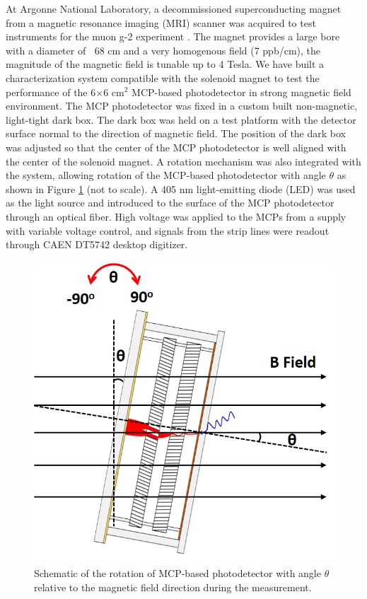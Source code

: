 \documentclass[preprint,5p]{elsarticle}
\begin{document}
At Argonne National Laboratory, a decommissioned superconducting magnet from a 
magnetic resonance imaging (MRI) scanner was acquired to test instruments for 
the muon g-2 experiment \cite{Magnet}. The magnet provides a large bore with a 
diameter of $~$ 68 cm and a very homogenous field (7 ppb/cm), the magnitude of 
the magnetic field is tunable up to 4 Tesla. We have built a characterization 
system compatible with the solenoid magnet to test the performance of the 
6$\times$6 cm$^2$ MCP-based photodetector in strong magnetic field environment.  
The MCP photodetector was fixed in a custom built non-magnetic, light-tight 
dark box. The dark box was held on a test platform with the detector surface 
normal to the direction of magnetic field. The position of the dark box was 
adjusted so that the center of the MCP photodetector is well aligned with the 
center of the solenoid magnet. A rotation mechanism was also integrated with 
the system, allowing rotation of the MCP-based photodetector with angle 
$\theta$ as shown in Figure \ref{fig:MCPs_theta_rotation} (not to scale). A 405 
nm light-emitting diode (LED) was used as the light source and introduced to 
the surface of the MCP photodetector through an optical fiber.  High voltage 
was applied to the MCPs from a supply with variable voltage control, and 
signals from the strip lines were readout through CAEN DT5742 desktop 
digitizer.

\begin{figure}[tbp]
\centering 
\includegraphics[scale=0.27]{fig/MCPs_theta_rotation.png}
\caption{Schematic of the rotation of MCP-based photodetector with angle 
$\theta$ relative to the magnetic field direction during the measurement.} 
\label{fig:MCPs_theta_rotation}
\end{figure}
\end{document}
